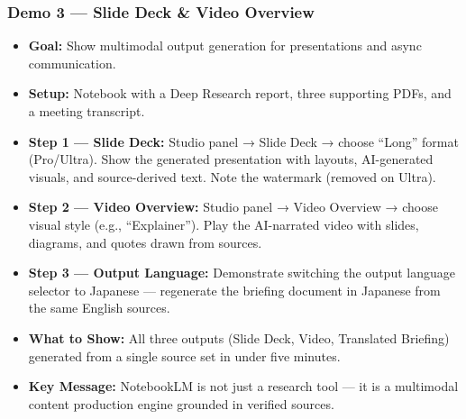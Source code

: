 \begin{frame}[fragile]\frametitle{Demo 3 — Slide Deck \& Video Overview}
  \begin{itemize}
    \item \textbf{Goal:} Show multimodal output generation for presentations and async communication.
    \item \textbf{Setup:} Notebook with a Deep Research report, three supporting PDFs, and a meeting transcript.
    \item \textbf{Step 1 — Slide Deck:} Studio panel → Slide Deck → choose ``Long'' format (Pro/Ultra). Show the generated presentation with layouts, AI-generated visuals, and source-derived text. Note the watermark (removed on Ultra).
    \item \textbf{Step 2 — Video Overview:} Studio panel → Video Overview → choose visual style (e.g., ``Explainer''). Play the AI-narrated video with slides, diagrams, and quotes drawn from sources.
    \item \textbf{Step 3 — Output Language:} Demonstrate switching the output language selector to Japanese — regenerate the briefing document in Japanese from the same English sources.
    \item \textbf{What to Show:} All three outputs (Slide Deck, Video, Translated Briefing) generated from a single source set in under five minutes.
    \item \textbf{Key Message:} NotebookLM is not just a research tool — it is a multimodal content production engine grounded in verified sources.
  \end{itemize}
\end{frame}

